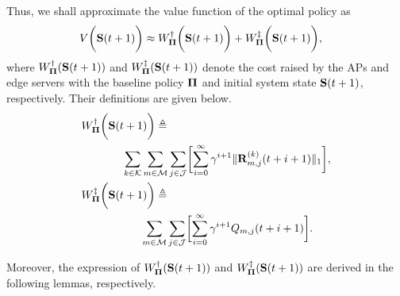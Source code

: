 Thus, we shall approximate the value function of the optimal policy as
\begin{align}
    &V\bigg(\mathbf{S}(t+1)\bigg) \approx
    W^{\dagger}_{\boldsymbol{\Pi}} \bigg(\mathbf{S}(t+1)\bigg) +
    W^{\ddagger}_{\boldsymbol{\Pi}} \bigg(\mathbf{S}(t+1)\bigg),
\end{align}
where $W^{\dagger}_{\boldsymbol{\Pi}}(\mathbf{S}(t+1))$ and $W^{\ddagger}_{\boldsymbol{\Pi}}(\mathbf{S}(t+1))$ denote the cost raised by the APs and edge servers with the baseline policy $\boldsymbol{\Pi}$ and initial system state $\mathbf{S}(t+1)$, respectively.
Their definitions are given below.
\begin{align}
    &W^{\dagger}_{\Baseline} \Paren{\Stat(t+1)} \define
    \nonumber\\
    &~~~~~~~~~~~\sum_{k\in\apSet}\sum_{m\in\esSet}\sum_{j\in\jSpace}\Bracket{
        \sum_{i=0}^{\infty} \gamma^{i+1} \Inorm{\vec{R}^{(k)}_{m,j}(t+i+1)}
    },
    \\    
    &W^{\ddagger}_{\Baseline}\Paren{\Stat(t+1)} \define
    \nonumber\\
    &~~~~~~~~~~~~~~~~\sum_{m\in\esSet}\sum_{j\in\jSpace}\Bracket{
        \sum_{i=0}^{\infty} \gamma^{i+1} Q_{m,j}(t+i+1)
    }.
\end{align}

Moreover, the expression of $W^{\dagger}_{\boldsymbol{\Pi}}(\mathbf{S}(t+1))$ and $W^{\ddagger}_{\boldsymbol{\Pi}}(\mathbf{S}(t+1))$ are derived in the following lemmas, respectively.

